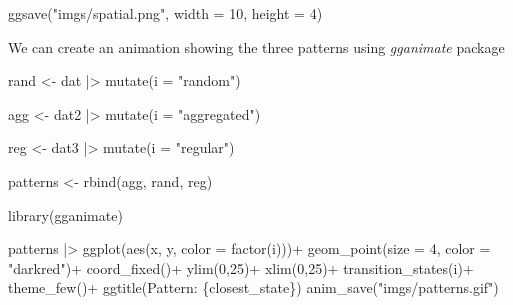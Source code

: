 \documentclass[
  letterpaper,
  DIV=11,
  numbers=noendperiod]{scrreprt}
\newenvironment{Shaded}{\begin{snugshade}}{\end{snugshade}}
\newcommand{\AttributeTok}[1]{\textcolor[rgb]{0.40,0.45,0.13}{#1}}
\newcommand{\DecValTok}[1]{\textcolor[rgb]{0.68,0.00,0.00}{#1}}
\newcommand{\FunctionTok}[1]{\textcolor[rgb]{0.28,0.35,0.67}{#1}}
\newcommand{\NormalTok}[1]{\textcolor[rgb]{0.00,0.23,0.31}{#1}}
\newcommand{\OtherTok}[1]{\textcolor[rgb]{0.00,0.23,0.31}{#1}}
\newcommand{\SpecialCharTok}[1]{\textcolor[rgb]{0.37,0.37,0.37}{#1}}
\newcommand{\StringTok}[1]{\textcolor[rgb]{0.13,0.47,0.30}{#1}}
\begin{document}
\begin{Shaded}
\begin{Highlighting}[]
\FunctionTok{ggsave}\NormalTok{(}\StringTok{"imgs/spatial.png"}\NormalTok{, }\AttributeTok{width =} \DecValTok{10}\NormalTok{, }\AttributeTok{height =} \DecValTok{4}\NormalTok{)}
\end{Highlighting}
\end{Shaded}

We can create an animation showing the three patterns using
\emph{gganimate} package

\begin{Shaded}
\begin{Highlighting}[]
\NormalTok{rand }\OtherTok{\textless{}{-}}\NormalTok{ dat }\SpecialCharTok{|\textgreater{}} 
  \FunctionTok{mutate}\NormalTok{(}\AttributeTok{i =} \StringTok{"random"}\NormalTok{)}

\NormalTok{agg }\OtherTok{\textless{}{-}}\NormalTok{ dat2 }\SpecialCharTok{|\textgreater{}} 
  \FunctionTok{mutate}\NormalTok{(}\AttributeTok{i =} \StringTok{"aggregated"}\NormalTok{)}

\NormalTok{reg }\OtherTok{\textless{}{-}}\NormalTok{ dat3 }\SpecialCharTok{|\textgreater{}} 
  \FunctionTok{mutate}\NormalTok{(}\AttributeTok{i =} \StringTok{"regular"}\NormalTok{)}

\NormalTok{patterns }\OtherTok{\textless{}{-}} \FunctionTok{rbind}\NormalTok{(agg, rand, reg)}

\FunctionTok{library}\NormalTok{(gganimate)}

\NormalTok{patterns }\SpecialCharTok{|\textgreater{}} 
\FunctionTok{ggplot}\NormalTok{(}\FunctionTok{aes}\NormalTok{(x, y, }\AttributeTok{color =} \FunctionTok{factor}\NormalTok{(i)))}\SpecialCharTok{+}
  \FunctionTok{geom\_point}\NormalTok{(}\AttributeTok{size =} \DecValTok{4}\NormalTok{, }\AttributeTok{color =} \StringTok{"darkred"}\NormalTok{)}\SpecialCharTok{+}
  \FunctionTok{coord\_fixed}\NormalTok{()}\SpecialCharTok{+}
  \FunctionTok{ylim}\NormalTok{(}\DecValTok{0}\NormalTok{,}\DecValTok{25}\NormalTok{)}\SpecialCharTok{+}
  \FunctionTok{xlim}\NormalTok{(}\DecValTok{0}\NormalTok{,}\DecValTok{25}\NormalTok{)}\SpecialCharTok{+}
  \FunctionTok{transition\_states}\NormalTok{(i)}\SpecialCharTok{+}
  \FunctionTok{theme\_few}\NormalTok{()}\SpecialCharTok{+}
  \FunctionTok{ggtitle}\NormalTok{(}\StringTok{\textquotesingle{}Pattern: \{closest\_state\}\textquotesingle{}}\NormalTok{)}
\FunctionTok{anim\_save}\NormalTok{(}\StringTok{"imgs/patterns.gif"}\NormalTok{)}
\end{Highlighting}
\end{Shaded}
\end{document}
